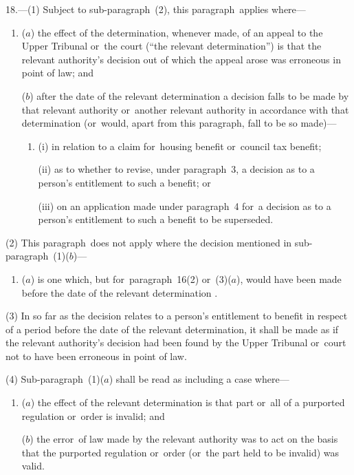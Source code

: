 \documentclass[12pt,a4paper]{article}
\begin{document}
18.---(1) Subject to sub-paragraph~(2), this paragraph~applies where—
\begin{enumerate}\item[]
($a$) the effect of the determination, whenever made, of an appeal 
to the Upper Tribunal  %
or~the court (“the relevant determination”) is that the relevant authority’s decision out of which the appeal arose was erroneous in point of law; and

($b$) after the date of the relevant determination a decision falls to be made by that relevant authority or~another relevant authority in accordance with that determination (or~would, apart from this paragraph, fall to be so made)—
\begin{enumerate}\item[]
(i) in relation to a claim for~housing benefit or~council tax benefit;

(ii) as to whether to revise, under paragraph~3, a decision as to a person’s entitlement to such a benefit; or

(iii) on an application made under paragraph~4 for~a decision as to a person’s entitlement to such a benefit to be superseded.
\end{enumerate}
\end{enumerate}

(2) This paragraph~does not apply where the decision mentioned in sub-paragraph~(1)($b$)—
\begin{enumerate}\item[]
($a$) is one which, but for~paragraph~16(2)  or~(3)($a$), would have been made before the date of the relevant determination%
%
.
\end{enumerate}

(3) In so far as the decision relates to a person’s entitlement to benefit in respect of a period before the date of the relevant determination, it shall be made as if the relevant authority’s decision had been found by 
the Upper Tribunal  %
or~court not to have been erroneous in point of law.

(4) Sub-paragraph~(1)($a$)  shall be read as including a case where—
\begin{enumerate}\item[]
($a$) the effect of the relevant determination is that part or~all of a purported regulation or~order is invalid; and

($b$) the error~of law made by the relevant authority was to act on the basis that the purported regulation or~order (or~the part held to be invalid) was valid.
\end{enumerate}
\end{document}
